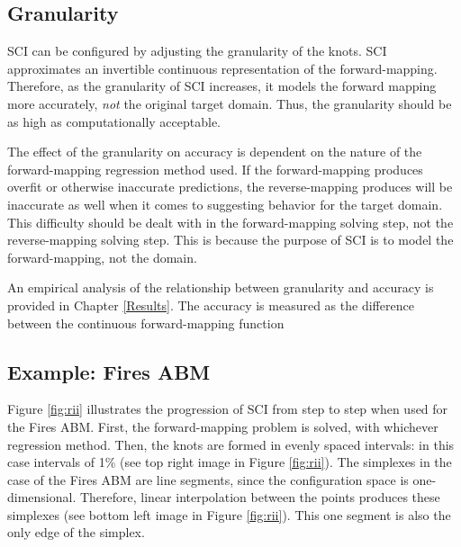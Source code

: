\subsection{Granularity}

SCI can be configured by adjusting the granularity of the knots.
SCI approximates an invertible continuous representation of the forward-mapping.
Therefore, as the granularity of SCI increases, it models the forward mapping more accurately, \textit{not} the original target domain.
Thus, the granularity should be as high as computationally acceptable.

The effect of the granularity on accuracy is dependent on the nature of the forward-mapping regression method used.
If the forward-mapping produces overfit or otherwise inaccurate predictions, the reverse-mapping produces will be inaccurate as well when it comes to suggesting behavior for the target domain.
This difficulty should be dealt with in the forward-mapping solving step, not the reverse-mapping solving step.
This is because the purpose of SCI is to model the forward-mapping, not the domain.

An empirical analysis of the relationship between granularity and accuracy is provided in Chapter \ref{Results}.
The accuracy is measured as the difference between the continuous forward-mapping function


\subsection{Example: Fires ABM}

Figure \ref{fig:rii} illustrates the progression of SCI from step to step when used for the Fires ABM.
First, the forward-mapping problem is solved, with whichever regression method.
Then, the knots are formed in evenly spaced intervals: in this case intervals of 1\% (see top right image in Figure \ref{fig:rii}).
The simplexes in the case of the Fires ABM are line segments, since the configuration space is one-dimensional.
Therefore, linear interpolation between the points produces these simplexes (see bottom left image in Figure \ref{fig:rii}).
This one segment is also the only edge of the simplex.

